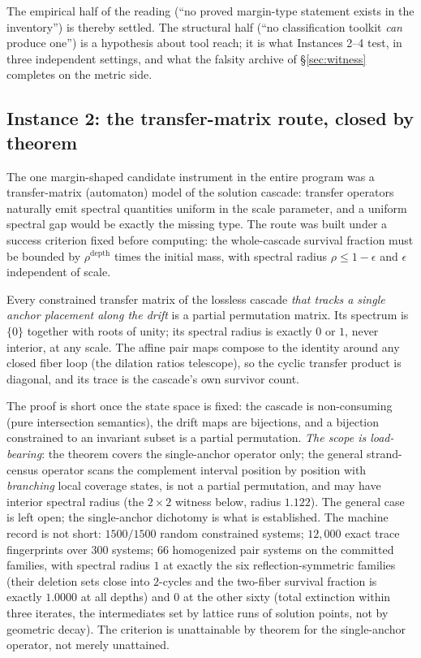 The empirical half of the reading (``no proved margin-type statement
exists in the inventory'') is thereby settled. The structural half (``no
classification toolkit \emph{can} produce one'') is a hypothesis about
tool reach; it is what Instances 2--4 test, in three independent
settings, and what the falsity archive of \S\ref{sec:witness} completes
on the metric side.

\subsection{Instance 2: the transfer-matrix route, closed by theorem}
\label{sec:tm-transfer}

The one margin-shaped candidate instrument in the entire program was a
transfer-matrix (automaton) model of the solution cascade: transfer
operators naturally emit spectral quantities uniform in the scale
parameter, and a uniform spectral gap would be exactly the missing type.
The route was built under a success criterion fixed before computing:
the whole-cascade survival fraction must be bounded by
$\rho^{\mathrm{depth}}$ times the initial mass, with spectral radius
$\rho\le 1-\epsilon$ and $\epsilon$ independent of scale.

\begin{lemma}
\label{lem:monomial}
Every constrained transfer matrix of the lossless cascade \emph{that
tracks a single anchor placement along the drift} is a partial
permutation matrix. Its spectrum is $\{0\}$ together with roots of unity;
its spectral radius is exactly $0$ or $1$, never interior, at any scale.
The affine pair maps compose to the identity
around any closed fiber loop (the dilation ratios telescope), so the
cyclic transfer product is diagonal, and its trace is the cascade's own
survivor count.
\end{lemma}

The proof is short once the state space is fixed: the cascade is
non-consuming (pure intersection semantics), the drift maps are
bijections, and a bijection constrained to an invariant subset is a
partial permutation. \emph{The scope is load-bearing}: the theorem
covers the single-anchor operator only; the general strand-census
operator scans the complement interval position by position with
\emph{branching} local coverage states, is not a partial permutation,
and may have interior spectral radius (the $2\times2$ witness below,
radius $1.122$). The general case is left open; the single-anchor
dichotomy is what is established. The machine record is not short:
$1500/1500$ random constrained systems; $12{,}000$ exact trace
fingerprints over $300$ systems; $66$ homogenized pair systems on the
committed families, with
spectral radius $1$ at exactly the six reflection-symmetric families
(their deletion sets close into $2$-cycles and the two-fiber survival
fraction is exactly $1.0000$ at all depths) and $0$ at the other sixty
(total extinction within three iterates, the intermediates set by lattice
runs of solution points, not by geometric decay). The criterion is
unattainable by theorem for the single-anchor operator, not merely
unattained.

